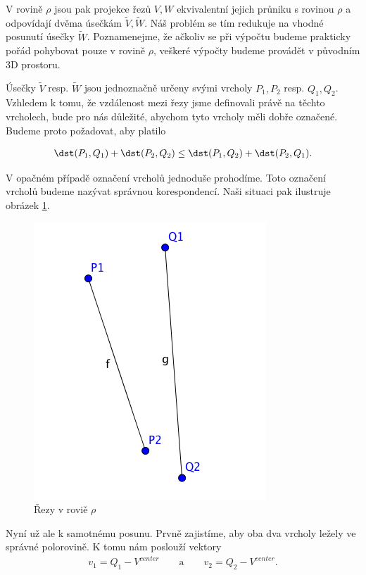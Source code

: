 V rovině $ \rho $ jsou pak projekce řezů $ V, W $ ekvivalentní jejich průniku
s rovinou $ \rho $ a odpovídají dvěma úsečkám $ \widetilde{V}, \widetilde{W} $.
Náš problém se tím redukuje na vhodné posunutí úsečky $ \widetilde{W} $.
Poznamenejme, že ačkoliv se při výpočtu budeme prakticky pořád pohybovat pouze
v rovině $ \rho $, veškeré výpočty budeme provádět v původním 3D prostoru.

Úsečky $ \widetilde{V} $ resp.
$ \widetilde{W} $ jsou jednoznačně určeny svými vrcholy $ P_1, P_2 $ resp. $ Q_1, Q_2 $.
Vzhledem k tomu, že vzdálenost mezi řezy jsme definovali právě na těchto vrcholech,
bude pro nás důležité, abychom tyto vrcholy měli dobře označené. Budeme proto
požadovat, aby platilo

\begin{align*}
    \dst(P_1, Q_1) + \dst(P_2, Q_2) \leq \dst(P_1, Q_2) + \dst(P_2, Q_1).
\end{align*}

V opačném případě označení vrcholů jednoduše prohodíme. Toto označení vrcholů
budeme nazývat správnou korespondencí. Naši situaci pak ilustruje obrázek
\ref{fig:segments_basic}.

\begin{figure}[ht]
    \centering
    \includegraphics{img/segments_basic.png}
    \caption{Řezy v roviě $ \rho $}
  \centering
  \label{fig:segments_basic}
\end{figure}

Nyní už ale k samotnému posunu. Prvně zajistíme, aby oba dva vrcholy ležely ve
správné polorovině. K tomu nám poslouží vektory
\begin{align*}
    v_1 = Q_1 - V^{center} \qquad\text{a}\qquad v_2 = Q_2 - V^{center}.
\end{align*}

